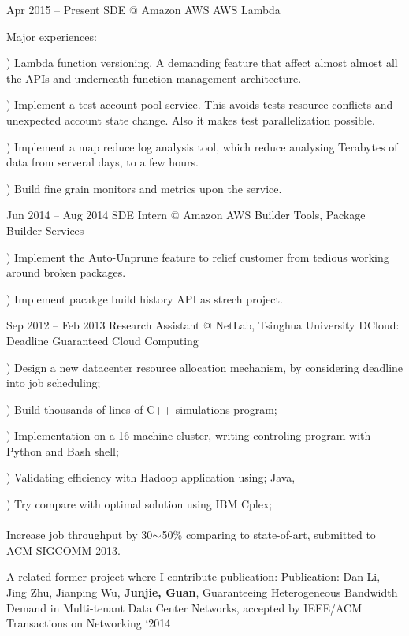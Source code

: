 \documentclass{tccv}
\begin{document}
\begin{eventlist}

\item{Apr 2015 -- Present}
     {SDE @ Amazon AWS}
     {AWS Lambda}

     \quad Major experiences:

     ) Lambda function versioning. A  demanding feature that affect almost almost all the APIs and underneath function management architecture.
     
     ) Implement a test account pool service. This avoids tests resource conflicts and unexpected account state change. Also it makes test parallelization possible.
     
     ) Implement a map reduce log analysis tool, which reduce analysing Terabytes of data from serveral days, to a few hours.

     ) Build fine grain monitors and metrics upon the service. 


\item{Jun 2014 -- Aug 2014}
     {SDE Intern @ Amazon AWS}
     {Builder Tools, Package Builder Services}
     
     ) Implement the Auto-Unprune feature to relief customer from tedious working around broken packages.
     
     ) Implement pacakge build history API as strech project.
     
     
\item{Sep 2012 -- Feb 2013}
     {Research Assistant @ NetLab, Tsinghua University}
     {DCloud: Deadline Guaranteed Cloud Computing}
     
     ) Design a new datacenter resource allocation mechanism, by considering deadline into job scheduling;
     
     ) Build thousands of lines of C++ simulations program;
     
     ) Implementation on a 16-machine cluster, writing controling  program with Python and Bash shell;
     
     ) Validating efficiency with Hadoop application using; Java, 
     
     ) Try compare with optimal solution using IBM Cplex;
	\\\\
     Increase job throughput by 30$\scriptsize{\sim}$50\% comparing to state-of-art, submitted to ACM SIGCOMM 2013.
     
     \quad A related former project where I contribute publication: Publication: Dan Li, Jing Zhu, Jianping Wu, \textbf{Junjie, Guan}, Guaranteeing Heterogeneous Bandwidth Demand in Multi-tenant Data Center Networks, accepted by IEEE/ACM Transactions on Networking ‘2014
     

\end{eventlist}
\end{document}
